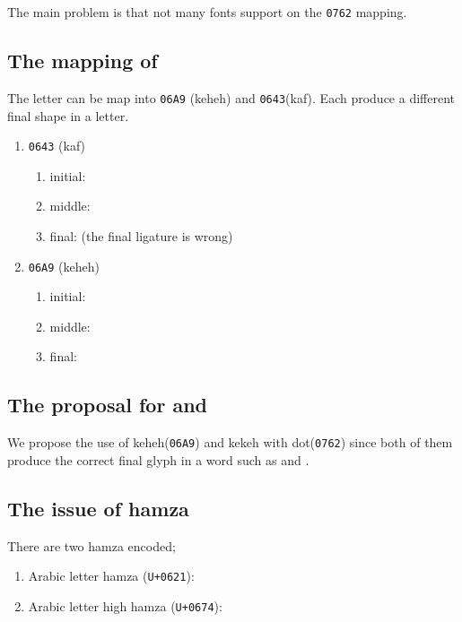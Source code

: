 \documentclass[12pt,a4paper]{IEEEconf}
\begin{document}
The main problem is that not many fonts support  on the \verb|0762| mapping.

\subsection{The mapping of   }


The letter  can be map into \verb|06A9| (keheh) and \verb|0643|(kaf). Each produce a different final shape in a letter.

\begin{enumerate}
\item {} \verb|0643| (kaf)
\begin{enumerate}
\item initial: 
\item middle: 
\item final:  (the final ligature is wrong)
\end{enumerate}

\item {} \verb|06A9| (keheh)
\begin{enumerate}
\item initial: 
\item middle: 
\item final: 
\end{enumerate}
\end{enumerate} 

\subsection{The proposal for  and }

We propose the use of keheh(\verb|06A9|) and kekeh with dot(\verb|0762|) since both of them produce the correct final glyph in a word such as  and .

\subsection{The issue of hamza }

There are two hamza encoded; 
\begin{enumerate}
\item Arabic letter hamza (\texttt{U+0621}): {}
\item Arabic letter high hamza (\texttt{U+0674}): {}
\end{enumerate}
\end{document}
